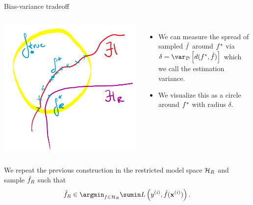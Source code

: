 \documentclass[11pt,compress,t,notes=noshow, xcolor=table]{beamer}
\begin{document}
\begin{vbframe}{Bias-variance tradeoff}
\begin{columns}[onlytextwidth,T]
  \includegraphics[width=1.0\textwidth]{figure_man/to_replace_estimation_variance.png}

      \lz 
      \begin{itemize}
          \item We can measure the spread of sampled $\hat{f}$ around $f^{\ast}$ via $\delta = \var_\D\left[d(\fbayes, \fh)\right]$ which we call the estimation variance.
          \item We visualize this as a circle around $f^{\ast}$ with radius $\delta.$
      \end{itemize}
    \end{columns}

\framebreak

We repeat the previous construction in the restricted model space $\mathcal{H}_R$ and sample $\hat{f}_R$ such that 
$$\fh_R \in \argmin_{f\in\Hspace_R} \sumin L\left(\yi, \fh (\xi)\right).$$
\begin{columns}[onlytextwidth,T]


\end{columns}
\end{vbframe}
\end{document}
